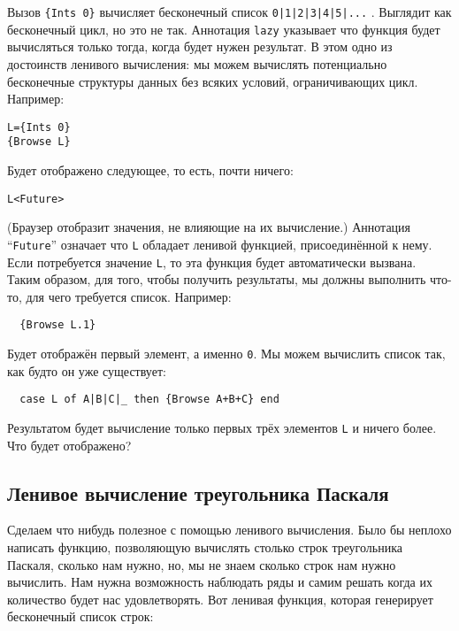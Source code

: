 Вызов \lstinline|{Ints 0}| вычисляет бесконечный список \lstinline!0|1|2|3|4|5|...! . Выглядит как бесконечный цикл, но это не так. Аннотация \lstinline|lazy| указывает что функция будет вычисляться только тогда, когда будет нужен результат. В этом одно из достоинств ленивого вычисления: мы можем вычислять потенциально бесконечные структуры данных без всяких условий, ограничивающих цикл. Например:

\begin{lstlisting}
L={Ints 0}
{Browse L}
\end{lstlisting}


Будет отображено следующее, то есть, почти ничего:

\begin{lstlisting}
L<Future>
\end{lstlisting}

(Браузер отобразит значения, не влияющие на их вычисление.) Аннотация ``\lstinline|Future|'' означает что \lstinline|L| обладает ленивой функцией, присоединённой к нему. Если потребуется значение \lstinline|L|, то эта функция будет автоматически вызвана. Таким образом, для того, чтобы получить результаты, мы должны выполнить что-то, для чего требуется список. Например:

\begin{lstlisting}
  {Browse L.1}
\end{lstlisting}

Будет отображён первый элемент, а именно \lstinline|0|. Мы можем вычислить список так, как будто он уже существует:

\begin{lstlisting}
  case L of A|B|C|_ then {Browse A+B+C} end
\end{lstlisting}

Результатом будет вычисление только первых трёх элементов \lstinline|L| и ничего более. Что будет отображено?

\subsection{Ленивое вычисление треугольника Паскаля}

Сделаем что нибудь полезное с помощью ленивого вычисления. Было бы неплохо написать функцию, позволяющую вычислять столько строк треугольника Паскаля, сколько нам нужно, но, мы не знаем сколько строк нам нужно вычислить. Нам нужна возможность наблюдать ряды и самим решать когда их количество будет нас удовлетворять. Вот ленивая функция, которая генерирует бесконечный список строк:

